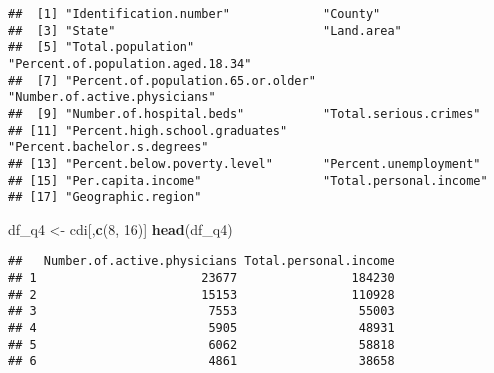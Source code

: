 \documentclass[
]{article}
\newenvironment{Shaded}{\begin{snugshade}}{\end{snugshade}}
\newcommand{\DecValTok}[1]{\textcolor[rgb]{0.00,0.00,0.81}{#1}}
\newcommand{\KeywordTok}[1]{\textcolor[rgb]{0.13,0.29,0.53}{\textbf{#1}}}
\newcommand{\NormalTok}[1]{#1}
\newcommand{\StringTok}[1]{\textcolor[rgb]{0.31,0.60,0.02}{#1}}
\begin{document}
\begin{verbatim}
##  [1] "Identification.number"             "County"                           
##  [3] "State"                             "Land.area"                        
##  [5] "Total.population"                  "Percent.of.population.aged.18.34" 
##  [7] "Percent.of.population.65.or.older" "Number.of.active.physicians"      
##  [9] "Number.of.hospital.beds"           "Total.serious.crimes"             
## [11] "Percent.high.school.graduates"     "Percent.bachelor.s.degrees"       
## [13] "Percent.below.poverty.level"       "Percent.unemployment"             
## [15] "Per.capita.income"                 "Total.personal.income"            
## [17] "Geographic.region"
\end{verbatim}

\begin{Shaded}
\begin{Highlighting}[]
\NormalTok{df_q4 <-}\StringTok{ }\NormalTok{cdi[,}\KeywordTok{c}\NormalTok{(}\DecValTok{8}\NormalTok{, }\DecValTok{16}\NormalTok{)]}
\KeywordTok{head}\NormalTok{(df_q4)}
\end{Highlighting}
\end{Shaded}

\begin{verbatim}
##   Number.of.active.physicians Total.personal.income
## 1                       23677                184230
## 2                       15153                110928
## 3                        7553                 55003
## 4                        5905                 48931
## 5                        6062                 58818
## 6                        4861                 38658
\end{verbatim}
\end{document}
